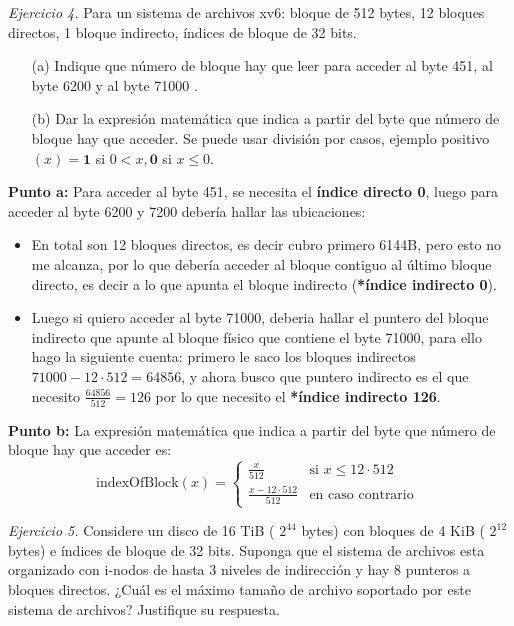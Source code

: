 \documentclass[12pt]{article}
\begin{document}
\noindent \textit{Ejercicio 4.} Para un sistema de archivos xv6: bloque de 512 bytes, 12 bloques directos, 1 bloque indirecto, índices de bloque de 32 bits.

\begin{itemize}
    \item[(a)] Indique que número de bloque hay que leer para acceder al byte 451, al byte 6200 y al byte 71000 .
    \item[(b)] Dar la expresión matemática que indica a partir del byte que número de bloque hay que acceder. Se puede usar división por casos, ejemplo positivo $(x)=\mathbf{1}$ si $0<x, \mathbf{0}$ si $x \leq 0$.
\end{itemize}

\begin{rta}
    \textbf{Punto a:} Para acceder al byte 451, se necesita el \textbf{índice directo 0}, luego para acceder al byte 6200 y 7200 debería hallar las ubicaciones:
    \begin{itemize}
        \item En total son 12 bloques directos, es decir cubro primero 6144B, pero esto no me alcanza, por lo que debería acceder al bloque contiguo al último bloque directo, es decir a lo que apunta el bloque indirecto (\textbf{*índice indirecto 0}).
        \item Luego si quiero acceder al byte 71000, deberia hallar el puntero del bloque indirecto que apunte al bloque físico que contiene el byte 71000, para ello hago la siguiente cuenta: primero le saco los bloques indirectos $71000-12\cdot 512 = 64856$, y ahora busco que puntero indirecto es el que necesito $\frac{64856}{512}=126$ por lo que necesito el \textbf{*índice indirecto 126}. 
    \end{itemize}
    \textbf{Punto b:} La expresión matemática que indica a partir del byte que número de bloque hay que acceder es:
    \begin{equation*}
        \text{indexOfBlock}(x) =
        \begin{cases}
            \frac{x}{512} & \text{si } x \leq 12 \cdot 512 \\
            \frac{x - 12 \cdot 512}{512} & \text{en caso contrario }
        \end{cases}
    \end{equation*}
\end{rta}

\noindent \textit{Ejercicio 5.} Considere un disco de 16 TiB ( $2^{44}$ bytes) con bloques de 4 KiB ( $2^{12}$ bytes) e índices de bloque de 32 bits. Suponga que el sistema de archivos esta organizado con i-nodos de hasta 3 niveles de indirección y hay 8 punteros a bloques directos. ¿Cuál es el máximo tamaño de archivo soportado por este sistema de archivos? Justifique su respuesta.
\end{document}
